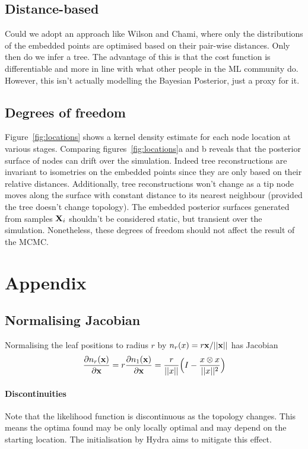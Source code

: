 \documentclass[11pt, twocolumn]{article}
\newcommand{\be}{\begin{equation*}}
\newcommand{\ee}{\end{equation*}}
\begin{document}
\subsection{Distance-based}
Could we adopt an approach like Wilson and Chami, where only the distributions of the embedded points are optimised based on their pair-wise distances.
Only then do we infer a tree.
The advantage of this is that the cost function is differentiable and more in line with what other people in the ML community do.
However, this isn't actually modelling the Bayesian Posterior, just a proxy for it.

\subsection{Degrees of freedom}
Figure~\ref{fig:locations} shows a kernel density estimate for each node location at various stages.
Comparing figures~\ref{fig:locations}a and b reveals that the posterior surface of nodes can drift over the simulation.
Indeed tree reconstructions are invariant to isometries on the embedded points since they are only based on their relative distances.
Additionally, tree reconstructions won't change as a tip node moves along the surface with constant distance to its nearest neighbour (provided the tree doesn't change topology).
The embedded posterior surfaces generated from samples $\bold{X}_{i}$ shouldn't be considered static, but transient over the simulation.
Nonetheless, these degrees of freedom should not affect the result of the MCMC.


\clearpage
\section{Appendix}


\subsection{Normalising Jacobian}
Normalising the leaf positions to radius $r$ by $n_{r}(x) = r \bold{x}/||\bold{x}||$ has Jacobian
\be
\frac{\partial n_{r}(\bold{x})}{\partial \bold{x}} = r \frac{\partial n_{1}(\bold{x})}{\partial \bold{x}} = 
\dfrac{r}{||x||} \Big( I - \dfrac{x \otimes x}{||x||^{2}} \Big)
\ee

\paragraph{Discontinuities}
Note that the likelihood function is discontinuous as the topology changes.
This means the optima found may be only locally optimal and may depend on the starting location.
The initialisation by Hydra aims to mitigate this effect.
\end{document}
